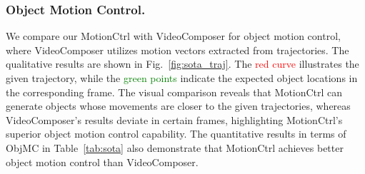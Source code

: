 \documentclass[sigconf]{acmart}
\begin{document}
\begin{table}
  \caption{\textcolor{black}{\textbf{Quantitative Comparisons with AnimateDiff~\cite{guo2023animatediff} and VideoComposer~\cite{wang2023videocomposer}.} Our \textbf{MotionCtrl} outperforms competing approaches in both camera and object motion control while also excelling at preserving text similarity and the quality of the video generation.}}
  \vspace{-0.3cm}
  \centering
  \vspace{-13pt}
  \label{tab:sota}
\end{table}


\subsubsection{Object Motion Control.}
We compare our MotionCtrl with VideoComposer for object motion control, where VideoComposer utilizes motion vectors extracted from trajectories. The qualitative results are shown in Fig.~\ref{fig:sota_traj}. The \textcolor{red}{red curve} illustrates the given trajectory, while the \textcolor{green}{green points} indicate the expected object locations in the corresponding frame. The visual comparison reveals that MotionCtrl can generate objects whose movements are closer to the given trajectories, whereas VideoComposer's results deviate in certain frames, highlighting MotionCtrl's superior object motion control capability. The quantitative results in terms of ObjMC in Table~\ref{tab:sota} also demonstrate that MotionCtrl achieves better object motion control than VideoComposer.
\end{document}
